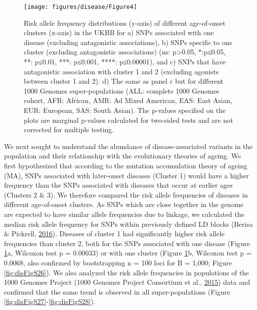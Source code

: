 \documentclass[12pt,twoside]{unicam}
\begin{document}
\begin{figure}

{\centering \texttt{[image: figures/disease/Figure4]} 

}

\caption[Risk allele frequency distributions of different age-of-onset clusters and SNPs specific to one disease, one age-of-onset cluster, or antagonistic between cluster 1 and 2.]{Risk allele frequency distributions (y-axis) of different age-of-onset clusters (x-axis) in the UKBB for a) SNPs associated with one disease (excluding antagonistic associations), b) SNPs specific to one cluster (excluding antagonistic associations) (ns: p>0.05, *:p≤0.05, **: p≤0.01, ***: p≤0.001, ****: p≤0.00001), and c) SNPs that have antagonistic association with cluster 1 and 2 (excluding agonists between cluster 1 and 2). d) The same as panel c but for different 1000 Genomes super-populations (ALL: complete 1000 Genomes cohort, AFR: African, AMR: Ad Mixed American, EAS: East Asian, EUR: European, SAS: South Asian). The p-values specified on the plots are marginal p-values calculated for two-sided tests and are not corrected for multiple testing.}\label{fig:disFig4}
\end{figure}

We next sought to understand the abundance of disease-associated variants in the population and their relationship with the evolutionary theories of ageing. We first hypothesized that according to the mutation accumulation theory of ageing (MA), SNPs associated with later-onset diseases (Cluster 1) would have a higher frequency than the SNPs associated with diseases that occur at earlier ages (Clusters 2 \& 3). We therefore compared the risk allele frequencies of diseases in different age-of-onset clusters. As SNPs which are close together in the genome are expected to have similar allele frequencies due to linkage, we calculated the median risk allele frequency for SNPs within previously defined LD blocks (Berisa \& Pickrell, \protect\hyperlink{ref-Berisa2016}{2016}). Diseases of cluster 1 had significantly higher risk allele frequencies than cluster 2, both for the SNPs associated with one disease (Figure \ref{fig:disFig4}a, Wilcoxon test p = 0.00033) or with one cluster (Figure \ref{fig:disFig4}b, Wilcoxon test p = 0.0068, also confirmed by bootstrapping n = 100 loci for B = 1,000; Figure \ref{fig:disFigS26}). We also analyzed the risk allele frequencies in populations of the 1000 Genomes Project (1000 Genomes Project Consortium et al., \protect\hyperlink{ref-1000_Genomes_Project_Consortium2015}{2015}) data and confirmed that the same trend is observed in all super-populations (Figure \ref{fig:disFigS27}-\ref{fig:disFigS28}).
\end{document}
